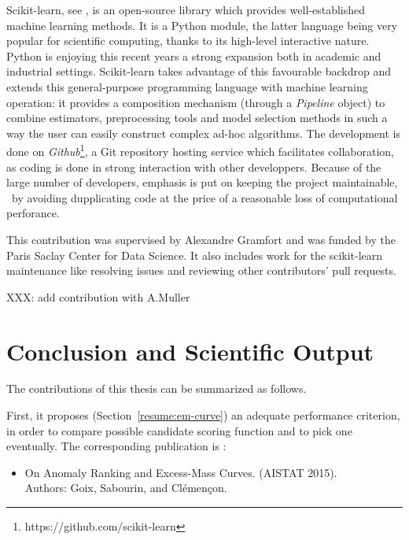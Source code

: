 Scikit-learn, see \cite{sklearn2011}, is an open-source library which provides well-established machine learning methods.
It is a Python module, the latter language being very popular for scientific computing, thanks to its high-level interactive nature. Python is enjoying this recent years a strong expansion both in academic and industrial settings. Scikit-learn takes advantage of this favourable backdrop and extends this general-purpose programming language with machine learning operation: %
it provides a composition mechanism (through a \emph{Pipeline} object) to combine estimators, preprocessing tools and model selection methods in such a way the user can easily construct complex ad-hoc algorithms.
%
The development is done on \emph{Github}\footnote{https://github.com/scikit-learn}, a Git repository hosting service which facilitates collaboration, as coding is done in strong interaction with other developpers. Because of the large number of developers, emphasis is put on keeping the project maintainable, \eg~by avoiding dupplicating code at the price of a reasonable loss of computational perforance.%


This contribution was supervised by Alexandre Gramfort and was funded by the Paris Saclay Center for Data Science. It also includes work for the scikit-learn maintenance like resolving issues and reviewing other contributors' pull requests.

XXX: add contribution with A.Muller


\section{Conclusion and Scientific Output}
The contributions of this thesis can be summarized as follows. 

First, it proposes (Section~\ref{resume:em-curve}) an adequate performance criterion, in order to compare possible candidate scoring function and to pick one eventually. 
The corresponding publication is \cite{AISTAT15}:
\begin{itemize}
\item On Anomaly Ranking and Excess-Mass Curves. (AISTAT 2015).\\
Authors: Goix, Sabourin, and Clémençon. 
\end{itemize}

